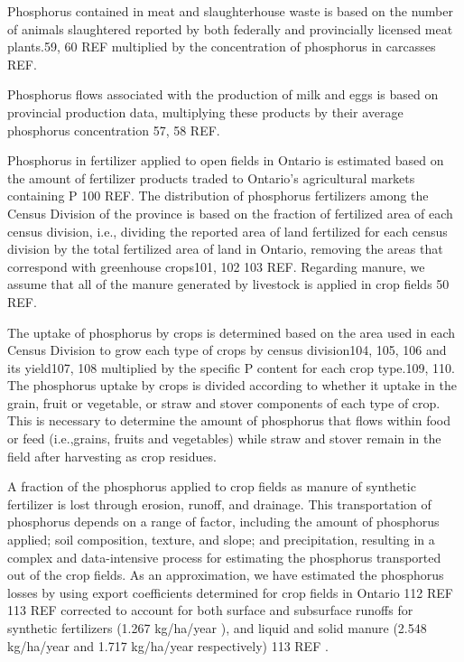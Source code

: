 \documentclass[authoryear]{elsarticle}
\begin{document}
Phosphorus contained in meat and slaughterhouse waste is based on the number of animals slaughtered reported by both federally and provincially licensed meat plants.59, 60 REF multiplied by the concentration of phosphorus in carcasses REF.

Phosphorus flows associated with the production of milk and eggs is based on provincial production data, multiplying these products by their average phosphorus concentration 57, 58 REF.

Phosphorus in fertilizer applied to open fields in Ontario is estimated based on the amount of fertilizer products traded to Ontario’s agricultural markets containing P 100 REF. The distribution of phosphorus fertilizers among the Census Division of the province is based on the fraction of fertilized area of each census division, i.e., dividing the reported area of land fertilized for each census division by the total fertilized area of land in Ontario, removing the areas that correspond with greenhouse crops101, 102 103 REF. 
Regarding manure, we assume that all of the manure generated by livestock is applied in crop fields 50 REF.

The uptake of phosphorus by crops is determined based on the area used in each Census Division to grow each type of crops by census division104, 105, 106 and its yield107, 108 multiplied by the specific P content for each crop type.109, 110.  The phosphorus uptake by crops is divided according to whether it uptake in the grain, fruit or vegetable, or
straw and stover components of each type of crop. This is necessary to determine the amount of phosphorus that flows within food or feed (i.e.,grains, fruits and vegetables) while straw and stover remain in the field after harvesting as crop residues.

A fraction of the phosphorus applied to crop fields as manure of synthetic fertilizer is lost through erosion, runoff, and drainage. This transportation of phosphorus depends on a range of factor, including the amount of phosphorus applied; soil composition, texture, and slope; and precipitation, resulting in a complex and data-intensive process for estimating the phosphorus transported out of the crop fields. As an approximation, we have estimated the phosphorus losses by using export coefficients determined for crop fields in Ontario 112 REF 113 REF corrected to account for both surface and subsurface runoffs for synthetic fertilizers (1.267 kg/ha/year ), and liquid and solid manure (2.548 kg/ha/year and 1.717 kg/ha/year respectively) 113 REF \citep{PFlows_Ontario}.
\end{document}
